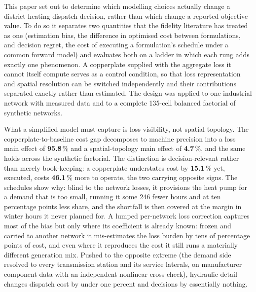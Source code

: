 
This paper set out to determine which modelling choices actually change a district-heating
dispatch decision, rather than which change a reported objective value. To do so it
separates two quantities that the fidelity literature has treated as one (estimation
bias, the difference in optimised cost between formulations, and decision regret, the cost
of executing a formulation's schedule under a common forward model) and evaluates both on
a ladder in which each rung adds exactly one phenomenon. A copperplate supplied with the
aggregate loss it cannot itself compute serves as a control condition, so that loss
representation and spatial resolution can be switched independently and their contributions
separated exactly rather than estimated. The design was applied to one industrial network
with measured data and to a complete 135-cell balanced factorial of synthetic networks.

What a simplified model must capture is loss visibility, not spatial topology. The
copperplate-to-baseline cost gap decomposes to machine precision into a loss main effect of
\textbf{95.8}\,\% and a spatial-topology main effect of \textbf{4.7}\,\%, and the same
holds across the synthetic factorial. The distinction is decision-relevant rather than
merely book-keeping: a copperplate understates cost by \textbf{15.1}\,\% yet, executed,
costs \textbf{46.1}\,\% more to operate, the two carrying opposite signs. The schedules show
why: blind to the network losses, it provisions the heat pump for a demand that is too
small, running it some 246 fewer hours and at ten percentage points less share, and the
shortfall is then covered at the margin in winter hours it never planned for. A lumped
per-network loss correction captures most of the bias but only where its coefficient is
already known: frozen and carried to another network it mis-estimates the loss burden by
tens of percentage points of cost, and even where it reproduces the cost it still runs a
materially different generation mix. Pushed to the opposite extreme (the demand side
resolved to every transmission station and its service laterals, on manufacturer component
data with an independent nonlinear cross-check), hydraulic detail changes dispatch cost by
under one percent and decisions by essentially nothing.

